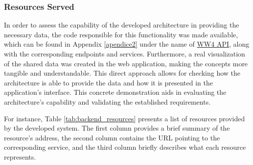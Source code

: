 \subsubsection{Resources Served}
In order to assess the capability of the developed architecture in providing the necessary data, the code responsible for this functionality was made available, which can be found in Appendix \ref{apendice2} under the name of \href{https://github.com/iaggocapitanio1/woodWork4.0_API}{WW4 API}, along with the corresponding endpoints and services. Furthermore, a real visualization of the shared data was created in the web application, making the concepts more tangible and understandable. This direct approach allows for checking how the architecture is able to provide the data and how it is presented in the application's interface. This concrete demonstration aids in evaluating the architecture's capability and validating the established requirements.

For instance, Table \ref{tab:backend_resources} presents a list of resources provided by the developed system. The first column provides a brief summary of the resource's address, the second column contains the URL pointing to the corresponding service, and the third column briefly describes what each resource represents.

